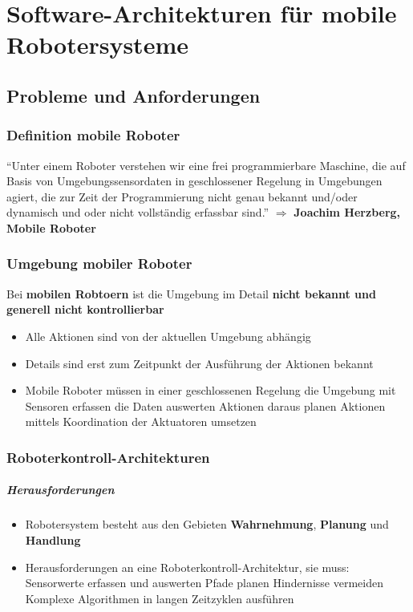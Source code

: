 \chapter{Software-Architekturen für mobile Robotersysteme}
\section{Probleme und Anforderungen}
\subsection{Definition mobile Roboter}
\enquote{Unter einem Roboter verstehen wir eine frei programmierbare Maschine, die auf Basis von Umgebungssensordaten in geschlossener Regelung in Umgebungen agiert, die zur Zeit der Programmierung nicht genau bekannt und/oder dynamisch und oder nicht vollständig erfassbar sind.}
$\Rightarrow$ \textbf{Joachim Herzberg, Mobile Roboter}
\subsection{Umgebung mobiler Roboter}
Bei \textbf{mobilen Robtoern} ist die Umgebung im Detail \textbf{nicht bekannt und generell nicht kontrollierbar}
\begin{itemize}
	\item Alle Aktionen sind von der aktuellen Umgebung abhängig
	\item Details sind erst zum Zeitpunkt der Ausführung der Aktionen bekannt
	\item Mobile Roboter müssen in einer geschlossenen Regelung
		\subitem die Umgebung mit Sensoren erfassen
		\subitem die Daten auswerten
		\subitem Aktionen daraus planen
		\subitem Aktionen mittels Koordination der Aktuatoren umsetzen
\end{itemize}
\subsection{Roboterkontroll-Architekturen}
\paragraph{Herausforderungen}
\begin{itemize}
	\item Robotersystem besteht aus den Gebieten \textbf{Wahrnehmung}, \textbf{Planung} und \textbf{Handlung}
	\item Herausforderungen an eine Roboterkontroll-Architektur, sie muss:
	\subitem Sensorwerte erfassen und auswerten
	\subitem Pfade planen
	\subitem Hindernisse vermeiden
	\subitem Komplexe Algorithmen in langen Zeitzyklen ausführen
\end{itemize}
